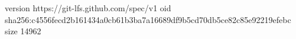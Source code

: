 version https://git-lfs.github.com/spec/v1
oid sha256:c4556fecd2b161434a0cb61b3ba7a16689df9b5cd70db5ce82c85e92219efebc
size 14962
